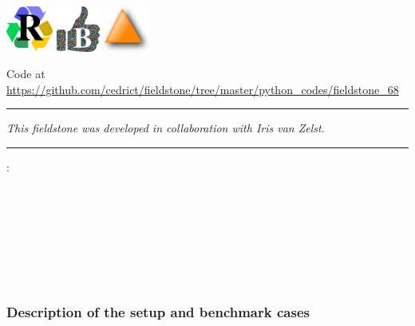 \includegraphics[height=1.5cm]{images/pictograms/replication}
\includegraphics[height=1.5cm]{images/pictograms/benchmark}
\includegraphics[height=1.5cm]{images/pictograms/triangle}



\begin{center}
Code at \url{https://github.com/cedrict/fieldstone/tree/master/python_codes/fieldstone_68}
\end{center}

\par\noindent\rule{\textwidth}{0.4pt}

{\sl This fieldstone was developed in collaboration with Iris van Zelst}. 

\par\noindent\rule{\textwidth}{0.4pt}



\Literature: \\
\textcite{vawo87}\\
\textcite{vack08}\\
\textcite{syva10}\\
\textcite{vakn12}\\
\textcite{vaws19}\\
\\
\\

\subsubsection*{Description of the setup and benchmark cases}


